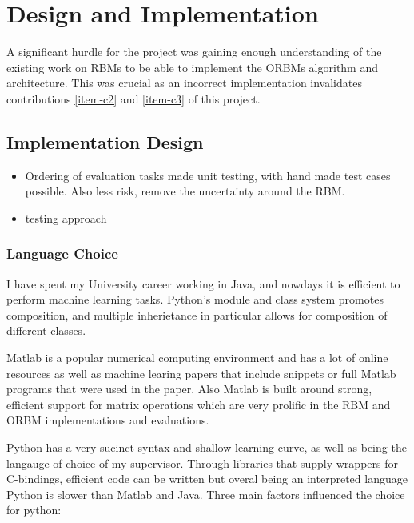 \chapter{Design and Implementation}\label{C:work}

A significant hurdle for the project was gaining enough understanding of the existing work on RBMs to be able to implement the ORBMs algorithm and architecture. This was crucial as an incorrect implementation invalidates  contributions \ref{item-c2} and \ref{item-c3} of this project.


\section{Implementation Design}

\begin{itemize}
  \item Ordering of evaluation tasks made unit testing, with hand made test cases possible. Also less risk, remove the uncertainty around the RBM.
  \item testing approach
\end{itemize}

\subsection{Language Choice}


I have spent my University career working in Java, and nowdays it is efficient to perform machine learning tasks. Python's module and class system promotes composition, and multiple inherietance in particular allows for composition of different classes.

Matlab is a popular numerical computing environment\todocite{} and has a lot of online resources as well as machine learing papers \todocite{} that include snippets or full Matlab programs that were used in the paper. Also Matlab is built around strong, efficient support for matrix operations which are very prolific in the RBM and ORBM implementations and evaluations.

Python has a very sucinct syntax and shallow learning curve\todocite{}, as well as being the langauge of choice of my supervisor.  Through libraries that supply wrappers for C-bindings, efficient code can be written but overal being an interpreted language Python is slower than Matlab and Java\todocite{}. Three main factors influenced the choice for python:

